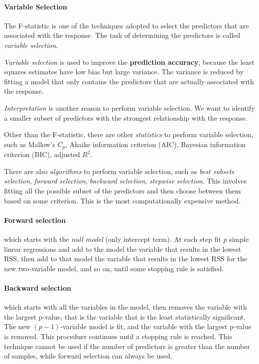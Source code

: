 

\paragraph*{Variable Selection}
The F-statistic is one of the techniques adopted to select the predictors that are associated with the response. The task of determining the predictors is called \textit{variable selection}.

\textit{Variable selection} is used to improve the \textbf{prediction accuracy}, because the least squares estimates have low bias but large variance. The variance is reduced by fitting a model that only contains the predictors that are actually associated with the response.

\textit{Interpretation} is another reason to perform variable selection. We want to identify a smaller subset of predictors with the strongest relationship with the response.

Other than the F-statistic, there are other \textit{statistics} to perform variable selection, such as Mallow's $C_p$, Akaike information criterion (AIC), Bayesian information criterion (BIC), adjusted $R^2$.

There are also \textit{algorithms} to perform variable selection, such as \textit{best subsets selection}, \textit{forward selection}, \textit{backward selection}, \textit{stepwise selection}. This involves fitting all the possible subset of the predictors and then choose between them based on some criterion. This is the most computationally expensive method.

\paragraph*{Forward selection} which starts with the \textit{null model} (only intercept term). At each step fit $p$ simple linear regressions and add to the model the variable that results in the lowest RSS, then add to that model the variable that results in the lowest RSS for the new two-variable model, and so on, until some stopping rule is satisfied.

\paragraph*{Backward selection} which starts with all the variables in the model, then removes the variable with the largest p-value, that is the variable that is the least statistically significant. The new $(p-1)$-variable model is fit, and the variable with the largest p-value is removed. This procedure continues until a stopping rule is reached. This technique cannot be used if the number of predictors is greater than the number of samples, while forward selection can always be used.

